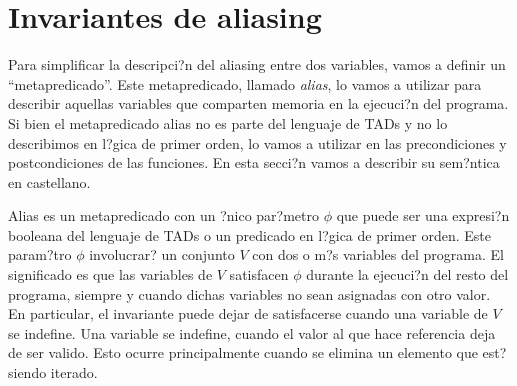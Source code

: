 \documentclass[a4paper,10pt]{article}
\begin{document}
\begin{tad}{}
  \tadAxiomas
\end{tad}

\section{Invariantes de aliasing}

Para simplificar la descripci?n del aliasing entre dos variables, vamos a definir un ``metapredicado''.  Este metapredicado, llamado \emph{alias}, lo vamos a utilizar para describir aquellas variables que comparten memoria en la ejecuci?n del programa.  Si bien el metapredicado alias no es parte del lenguaje de TADs y no lo describimos en l?gica de primer orden, lo vamos a utilizar en las precondiciones y postcondiciones de las funciones.  En esta secci?n vamos a describir su sem?ntica en castellano.

Alias es un metapredicado con un ?nico par?metro $\phi$ que puede ser una expresi?n booleana del lenguaje de TADs o un predicado en l?gica de primer orden.  Este param?tro $\phi$ involucrar? un conjunto $V$ con dos o m?s variables del programa.  El significado es que las variables de $V$ satisfacen $\phi$ durante la ejecuci?n del resto del programa, siempre y cuando dichas variables no sean asignadas con otro valor.  En particular, el invariante puede dejar de satisfacerse cuando una variable de $V$ se indefine.  Una variable se indefine, cuando el valor al que hace referencia deja de ser valido.  Esto ocurre principalmente cuando se elimina un elemento que est? siendo iterado.
\end{document}
